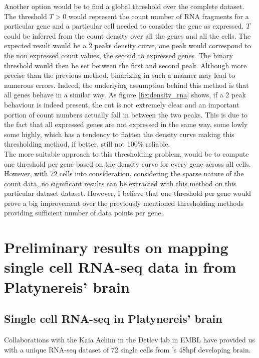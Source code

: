   Another option would be to find a global threshold over the complete dataset. The threshold $T>0$ would represent the count number of RNA fragments for a particular gene and a particular cell needed to consider the gene as expressed. $T$ could be inferred from the count density over all the genes and all the cells. The expected result would be a 2 peaks density curve, one peak would correspond to the non expressed count values, the second to expressed genes. The binary threshold would then be set between the first and second peak. Although more precise than the previous method, binarizing in such a manner may lead to numerous errors. Indeed, the underlying assumption behind this method is that all genes behave in a similar way. As figure \ref{fig:density_rna} shows, if a 2 peak behaviour is indeed present, the cut is not extremely clear and an important portion of count numbers actually fall in between the two peaks. This is due to the fact that all expressed genes are not expressed in the same way, some lowly some highly, which has a tendency to flatten the density curve making this thresholding method, if better, still not 100\% reliable.\\
  
  The more suitable approach to this thresholding problem, would be to compute one threshold per gene based on the density curve for every gene across all cells. However, with 72 cells into consideration, considering the sparse nature of the count data, no significant results can be extracted with this method on this particular dataset dataset. However, I believe that one threshold per gene would prove a big improvement over the previously mentioned thresholding methods providing sufficient number of data points per gene.

\section{Preliminary results on mapping single cell RNA-seq data in from Platynereis' brain}\label{sec:back_mapping_platy}
  \subsection{Single cell RNA-seq in Platynereis' brain}
  
    	Collaborations with the Kaia Achim in the Detlev lab in EMBL have provided us with a unique RNA-seq dataset of 72 single cells from \platy{}'s 48hpf developing brain. 
    	
